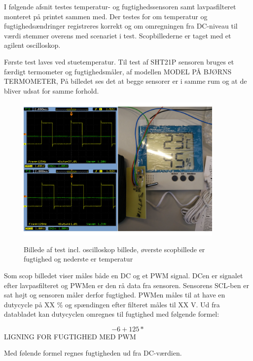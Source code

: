 

I følgende afsnit testes temperatur- og fugtighedssensoren samt lavpasfilteret monteret på printet sammen med. Der testes for om temperatur og fugtighedsændringer registreres korrekt og om omregningen fra DC-niveau til værdi stemmer overens med scenariet i test. Scopbillederne er taget med et agilent oscilloskop.

Første test laves ved stuetemperatur. Til test af SHT21P sensoren bruges et færdigt termometer og fugtighedsmåler, af modellen MODEL PÅ BJØRNS TERMOMETER, På billedet ses det at begge sensorer er i samme rum og at de bliver udsat for samme forhold. 

\begin{figure}[h]
\centering
{\includegraphics[width=0.90\textwidth]{filer/modultest/Billeder/test_stue}}
\caption{Billede af test incl. oscilloskop billede, øverste scopbillede er fugtighed og nederste er temperatur}
\label{lab:test_stue}
\end{figure}

Som scop billedet viser måles både en DC og et PWM signal. DCen er signalet efter lavpasfilteret og PWMen er den rå data fra sensoren. 
Sensorens SCL-ben er sat højt og sensoren måler derfor fugtighed. PWMen måles til at have en dutycycle på XX \% og spændingen efter filteret måles til XX V. Ud fra databladet kan dutycyclen omregnes til fugtighed med følgende formel:

\begin{equation}
-6+125*
\end{equation}
LIGNING FOR FUGTIGHED MED PWM

Med følende formel regnes fugtigheden ud fra DC-værdien.

